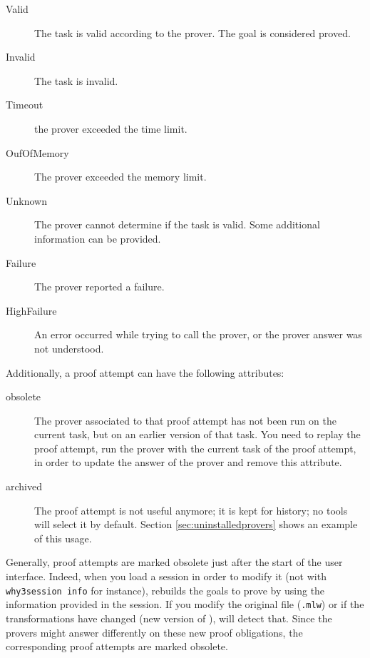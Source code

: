 \begin{description}
\item[Valid] The task is valid according to the prover. The
  goal is considered proved.
\item[Invalid] The task is invalid.
\item[Timeout] the prover exceeded the time limit.
\item[OufOfMemory] The prover exceeded the memory limit.
\item[Unknown] The prover cannot determine if the task
  is valid. Some additional information can be provided.
\item[Failure] The prover reported a failure.
\item[HighFailure] An error occurred while trying to call the
  prover, or the prover answer was not understood.
\end{description}

Additionally, a proof attempt can have the following attributes:

\begin{description}
\item[obsolete] The prover associated to
  that proof attempt has not been run on the current task, but on an
  earlier version of that task. You need to replay the proof
  attempt, \ie run the prover with the current task of the proof
  attempt, in order to update the answer of the prover and remove this
  attribute.
\item[archived]  The proof attempt is not useful
  anymore; it is kept for history; no \why tools will select it by
  default. Section \ref{sec:uninstalledprovers} shows an example
  of this usage.
\end{description}

Generally, proof attempts are marked obsolete just after
the start of the user interface. Indeed, when you load a session in order to
modify it (not with \texttt{why3session info} for instance), \why
rebuilds the goals to prove by using the information provided in the
session. If you modify the original file (\texttt{.mlw}) or if the
transformations have changed (new version of \why), \why will detect
that. Since the provers might answer differently on these new
proof obligations, the corresponding proof attempts are marked obsolete.


